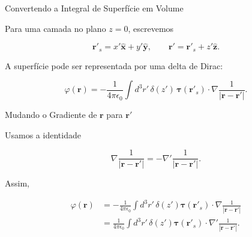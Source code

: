 \documentclass[aspectratio=169]{beamer}
\begin{document}
\begin{frame}{Convertendo a Integral de Superfície em Volume}

Para uma camada no plano \(z=0\), escrevemos

\[
\mathbf r'_s=x'\hat{\mathbf x}+y'\hat{\mathbf y},
\qquad
\mathbf r'
=
\mathbf r'_s+z'\hat{\mathbf z}.
\]

A superfície pode ser representada por uma delta de Dirac:

\begin{eqbox}
\begin{equation}
\varphi(\mathbf r)
=
-\frac{1}{4\pi\epsilon_0}
\int
d^3r'\,
\delta(z')\,
\boldsymbol{\tau}(\mathbf r'_s)\cdot
\nabla
\frac{1}{|\mathbf r-\mathbf r'|}.
\tag{4.36}
\label{eq:4.36}
\end{equation}
\end{eqbox}

\end{frame}

\begin{frame}{Mudando o Gradiente de \(\mathbf r\) para \(\mathbf r'\)}

Usamos a identidade

\begin{equation}
\nabla
\frac{1}{|\mathbf r-\mathbf r'|}
=
-\nabla'
\frac{1}{|\mathbf r-\mathbf r'|}.
\end{equation}

Assim,

\begin{align}
\varphi(\mathbf r)
&=
-\frac{1}{4\pi\epsilon_0}
\int d^3r'\,
\delta(z')\boldsymbol{\tau}(\mathbf r'_s)\cdot
\nabla
\frac{1}{|\mathbf r-\mathbf r'|}
\\
&=
\frac{1}{4\pi\epsilon_0}
\int d^3r'\,
\delta(z')\boldsymbol{\tau}(\mathbf r'_s)\cdot
\nabla'
\frac{1}{|\mathbf r-\mathbf r'|}.
\end{align}

\end{frame}
\end{document}
